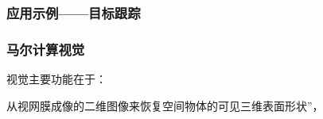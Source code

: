 \documentclass{beamer}
\begin{document}
{{\begin{frame}
  {\hspace{5em}}
\end{frame}}{\begin{frame}
  \frametitle{应用示例------目标跟踪}
  
  \qquad{}
\end{frame}}{\begin{frame}
  \frametitle{马尔计算视觉}
  
  视觉主要功能在于：
  
  {\hspace{4em}}从视网膜成像的二维图像来恢复空间物体的可见三维表面形状''，
  

\end{frame}}}
\end{document}
